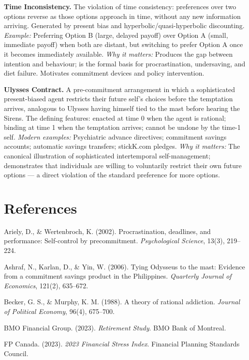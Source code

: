 \documentclass[12pt, letterpaper]{article}
\begin{document}
\textbf{Time Inconsistency.} The violation of time consistency: preferences over two options reverse as those options approach in time, without any new information arriving. Generated by present bias and hyperbolic/quasi-hyperbolic discounting. \textit{Example:} Preferring Option B (large, delayed payoff) over Option A (small, immediate payoff) when both are distant, but switching to prefer Option A once it becomes immediately available. \textit{Why it matters:} Produces the gap between intention and behaviour; is the formal basis for procrastination, undersaving, and diet failure. Motivates commitment devices and policy intervention.

\textbf{Ulysses Contract.} A pre-commitment arrangement in which a sophisticated present-biased agent restricts their future self's choices before the temptation arrives, analogous to Ulysses having himself tied to the mast before hearing the Sirens. The defining features: enacted at time 0 when the agent is rational; binding at time 1 when the temptation arrives; cannot be undone by the time-1 self. \textit{Modern examples:} Psychiatric advance directives; commitment savings accounts; automatic savings transfers; stickK.com pledges. \textit{Why it matters:} The canonical illustration of sophisticated intertemporal self-management; demonstrates that individuals are willing to voluntarily restrict their own future options --- a direct violation of the standard preference for more options.

\medskip


\section*{References}


Ariely, D., \& Wertenbroch, K. (2002). Procrastination, deadlines, and performance: Self-control by precommitment. \textit{Psychological Science}, 13(3), 219--224.

Ashraf, N., Karlan, D., \& Yin, W. (2006). Tying Odysseus to the mast: Evidence from a commitment savings product in the Philippines. \textit{Quarterly Journal of Economics}, 121(2), 635--672.

Becker, G. S., \& Murphy, K. M. (1988). A theory of rational addiction. \textit{Journal of Political Economy}, 96(4), 675--700.

BMO Financial Group. (2023). \textit{Retirement Study}. BMO Bank of Montreal.

FP Canada. (2023). \textit{2023 Financial Stress Index}. Financial Planning Standards Council.
\end{document}

